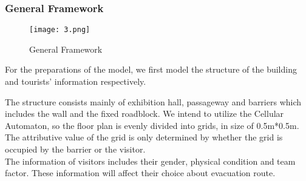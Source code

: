 \documentclass{mcmthesis}
\begin{document}
\subsubsection{General Framework}
\begin{figure}[htbp]
	\centering
	\caption{General Framework}
	\texttt{[image: 3.png]}
\end{figure}
\noindent For the preparations of the model, we first model the structure of the building and tourists' information respectively.
\par\indent The structure consists mainly of exhibition hall, passageway and barriers which includes the wall and the fixed roadblock. We intend to utilize the Cellular Automaton, so the floor plan is evenly divided into grids, in size of 0.5m*0.5m. The attributive value of the grid is only determined by whether the grid is occupied by the barrier or the visitor.\\
\indent The information of visitors includes their gender, physical condition and team factor. These information will affect their choice about evacuation route.
\end{document}
